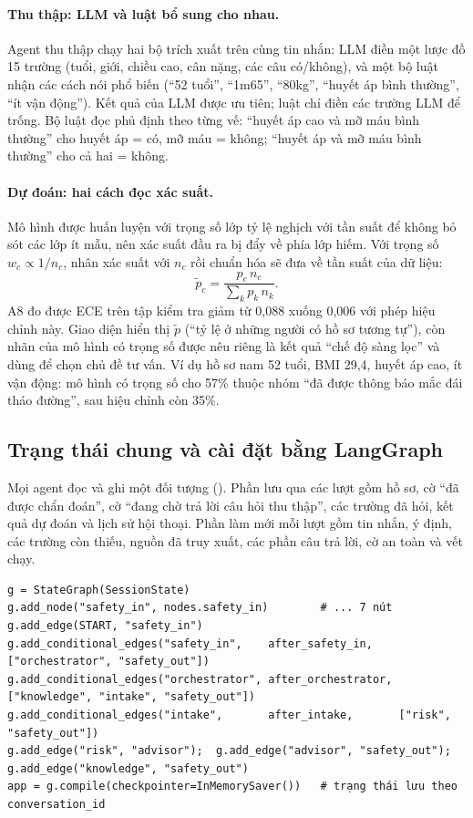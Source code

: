 \documentclass[11pt,a4paper]{article}
\begin{document}
\paragraph{Thu thập: LLM và luật bổ sung cho nhau.}
Agent thu thập chạy hai bộ trích xuất trên cùng tin nhắn: LLM điền một lược đồ 15 trường (tuổi, giới, chiều cao, cân nặng,
các câu có/không), và một bộ luật nhận các cách nói phổ biến (“52 tuổi”, “1m65”, “80kg”, “huyết áp bình thường”, “ít vận
động”). Kết quả của LLM được ưu tiên; luật chỉ điền các trường LLM để trống. Bộ luật đọc phủ định theo từng vế: “huyết áp
cao và mỡ máu bình thường” cho huyết áp = có, mỡ máu = không; “huyết áp và mỡ máu bình thường” cho cả hai = không.

\paragraph{Dự đoán: hai cách đọc xác suất.}
Mô hình được huấn luyện với trọng số lớp tỷ lệ nghịch với tần suất để không bỏ sót các lớp ít mẫu, nên xác suất đầu ra bị
đẩy về phía lớp hiếm. Với trọng số $w_c \propto 1/n_c$, nhân xác suất với $n_c$ rồi chuẩn hóa sẽ đưa về tần suất của dữ liệu:
\[ \tilde p_c = \frac{p_c\, n_c}{\sum_k p_k\, n_k}. \]
A8 đo được ECE trên tập kiểm tra giảm từ 0,088 xuống 0,006 với phép hiệu chỉnh này. Giao diện hiển thị $\tilde p$ (“tỷ lệ ở
những người có hồ sơ tương tự”), còn nhãn của mô hình có trọng số được nêu riêng là kết quả “chế độ sàng lọc” và dùng để
chọn chủ đề tư vấn. Ví dụ hồ sơ nam 52 tuổi, BMI 29,4, huyết áp cao, ít vận động: mô hình có trọng số cho 57\% thuộc nhóm
“đã được thông báo mắc đái tháo đường”, sau hiệu chỉnh còn 35\%.

\subsection{Trạng thái chung và cài đặt bằng LangGraph}

Mọi agent đọc và ghi một đối tượng  (). Phần lưu qua các lượt gồm hồ sơ, cờ “đã được
chẩn đoán”, cờ “đang chờ trả lời câu hỏi thu thập”, các trường đã hỏi, kết quả dự đoán và lịch sử hội thoại. Phần làm mới
mỗi lượt gồm tin nhắn, ý định, các trường còn thiếu, nguồn đã truy xuất, các phần câu trả lời, cờ an toàn và vết chạy.

\begin{Verbatim}[fontsize=\scriptsize, frame=single, framesep=4pt, rulecolor=\color{rulegray}]
g = StateGraph(SessionState)
g.add_node("safety_in", nodes.safety_in)        # ... 7 nút
g.add_edge(START, "safety_in")
g.add_conditional_edges("safety_in",    after_safety_in,    ["orchestrator", "safety_out"])
g.add_conditional_edges("orchestrator", after_orchestrator, ["knowledge", "intake", "safety_out"])
g.add_conditional_edges("intake",       after_intake,       ["risk", "safety_out"])
g.add_edge("risk", "advisor");  g.add_edge("advisor", "safety_out");  g.add_edge("knowledge", "safety_out")
app = g.compile(checkpointer=InMemorySaver())   # trạng thái lưu theo conversation_id
\end{Verbatim}
\end{document}
